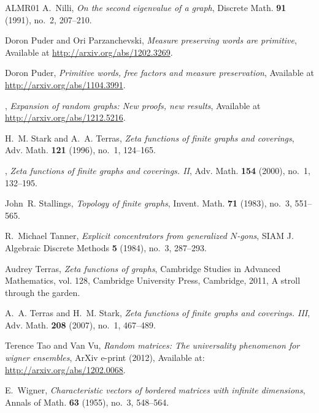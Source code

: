 \documentclass{memo-l}
\theoremstyle{plain}
\theoremstyle{definition}
\numberwithin{section}{chapter}
\numberwithin{equation}{chapter}
\theoremstyle{plain}
\theoremstyle{definition}
\begin{document}
\begin{thebibliography}{ALMR01}
A.~Nilli, \emph{On the second eigenvalue of a graph}, Discrete Math.
  \textbf{91} (1991), no.~2, 207--210. 

Doron Puder and Ori Parzanchevski, \emph{Measure preserving words are
  primitive}, Available at \url{http://arxiv.org/abs/1202.3269}.

Doron Puder, \emph{Primitive words, free factors and measure preservation},
  Available at \url{http://arxiv.org/abs/1104.3991}.

\bysame, \emph{Expansion of random graphs: New proofs, new results}, Available
  at \url{http://arxiv.org/abs/1212.5216}.

H.~M. Stark and A.~A. Terras, \emph{Zeta functions of finite graphs and
  coverings}, Adv. Math. \textbf{121} (1996), no.~1, 124--165. 

\bysame, \emph{Zeta functions of finite graphs and coverings. {II}}, Adv. Math.
  \textbf{154} (2000), no.~1, 132--195. 

John~R. Stallings, \emph{Topology of finite graphs}, Invent. Math. \textbf{71}
  (1983), no.~3, 551--565. 

R.~Michael Tanner, \emph{Explicit concentrators from generalized {$N$}-gons},
  SIAM J. Algebraic Discrete Methods \textbf{5} (1984), no.~3, 287--293.

Audrey Terras, \emph{Zeta functions of graphs}, Cambridge Studies in Advanced
  Mathematics, vol. 128, Cambridge University Press, Cambridge, 2011, A stroll
  through the garden. 

A.~A. Terras and H.~M. Stark, \emph{Zeta functions of finite graphs and
  coverings. {III}}, Adv. Math. \textbf{208} (2007), no.~1, 467--489.

Terence Tao and Van Vu, \emph{Random matrices: The universality phenomenon for
  wigner ensembles}, {ArXiv} e-print (2012), Available at:
  \url{http://arxiv.org/abs/1202.0068}.

E.~Wigner, \emph{Characteristic vectors of bordered matrices with infinite
  dimensions}, Annals of Math. \textbf{63} (1955), no.~3, 548--564.

\end{thebibliography}
%
\end{document}
